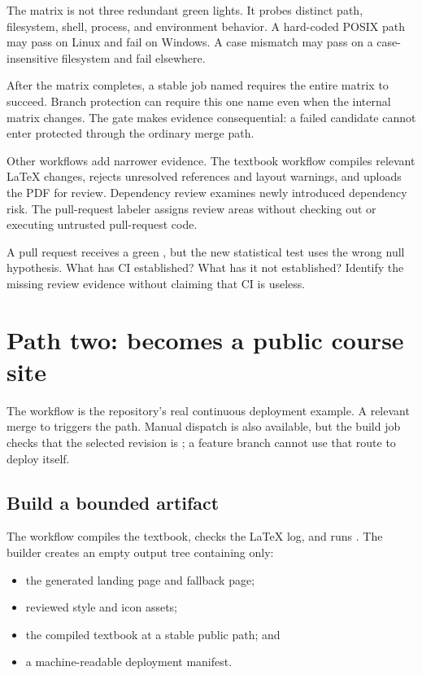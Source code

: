 The matrix is not three redundant green lights. It probes distinct path,
filesystem, shell, process, and environment behavior. A hard-coded POSIX path
may pass on Linux and fail on Windows. A case mismatch may pass on a
case-insensitive filesystem and fail elsewhere.

After the matrix completes, a stable job named  requires the
entire matrix to succeed. Branch protection can require this one name even when
the internal matrix changes. The gate makes evidence consequential: a failed
candidate cannot enter protected  through the ordinary merge path.

Other workflows add narrower evidence. The textbook workflow compiles relevant
LaTeX changes, rejects unresolved references and layout warnings, and uploads
the PDF for review. Dependency review examines newly introduced dependency
risk. The pull-request labeler assigns review areas without checking out or
executing untrusted pull-request code.

\begin{checkpointbox}
A pull request receives a green , but the new statistical test
uses the wrong null hypothesis. What has CI established? What has it not
established? Identify the missing review evidence without claiming that CI is
useless.
\end{checkpointbox}

\section{Path two:  becomes a public course site}

The  workflow is the repository's real continuous
deployment example. A relevant merge to  triggers the path. Manual
dispatch is also available, but the build job checks that the selected revision
is ; a feature branch cannot use that route to deploy itself.

\subsection{Build a bounded artifact}

The workflow compiles the textbook, checks the LaTeX log, and runs
. The builder creates an empty output tree
containing only:

\begin{itemize}
  \item the generated landing page and fallback page;
  \item reviewed style and icon assets;
  \item the compiled textbook at a stable public path; and
  \item a machine-readable deployment manifest.
\end{itemize}

